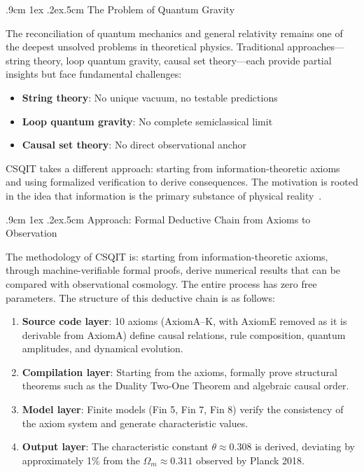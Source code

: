 \documentclass[aps,prd,twocolumn,nofootinbib,floatfix]{revtex4-2}
\makeatletter
\def\subsection{%
  \@startsection{subsection}{2}{\z@}
    {.9cm \@plus1ex \@minus .2ex}{.5cm}
    {\normalfont\normalsize\bfseries\centering}%
}
\makeatother
\begin{document}
\subsection{The Problem of Quantum Gravity}

The reconciliation of quantum mechanics and general relativity remains one of the deepest unsolved problems in theoretical physics. Traditional approaches---string theory, loop quantum gravity, causal set theory---each provide partial insights but face fundamental challenges:

\begin{itemize}
    \item \textbf{String theory}: No unique vacuum, no testable predictions
    \item \textbf{Loop quantum gravity}: No complete semiclassical limit
    \item \textbf{Causal set theory}: No direct observational anchor
\end{itemize}

CSQIT takes a different approach: starting from information-theoretic axioms and using formalized verification to derive consequences. The motivation is rooted in the idea that information is the primary substance of physical reality~\cite{Wheeler1989}.

\subsection{Approach: Formal Deductive Chain from Axioms to Observation}

The methodology of CSQIT is: starting from information-theoretic axioms, through machine-verifiable formal proofs, derive numerical results that can be compared with observational cosmology. The entire process has zero free parameters. The structure of this deductive chain is as follows:

\begin{enumerate}
    \item \textbf{Source code layer}: 10 axioms (AxiomA--K, with AxiomE removed as it is derivable from AxiomA) define causal relations, rule composition, quantum amplitudes, and dynamical evolution.
    \item \textbf{Compilation layer}: Starting from the axioms, formally prove structural theorems such as the Duality Two-One Theorem and algebraic causal order.
    \item \textbf{Model layer}: Finite models (Fin 5, Fin 7, Fin 8) verify the consistency of the axiom system and generate characteristic values.
    \item \textbf{Output layer}: The characteristic constant $\theta \approx 0.308$ is derived, deviating by approximately 1\% from the $\Omega_m \approx 0.311$ observed by Planck 2018.
\end{enumerate}
\end{document}
